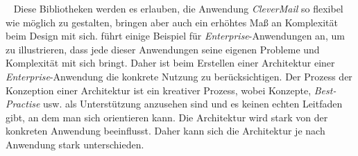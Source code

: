 \ \newline
Diese Bibliotheken werden es erlauben, die Anwendung \emph{CleverMail} so flexibel wie möglich zu gestalten, bringen aber auch ein erhöhtes Maß an Komplexität beim Design mit sich. 
\newline
\newline
\cite[5-6]{patternsOfEnterprise} führt einige Beispiel für \emph{Enterprise}-Anwendungen an, um zu illustrieren, dass jede dieser Anwendungen seine eigenen Probleme und Komplexität mit sich bringt. Daher ist beim Erstellen einer Architektur einer \emph{Enterprise}-Anwendung die konkrete Nutzung zu berücksichtigen. Der Prozess der Konzeption einer Architektur ist ein kreativer Prozess, wobei Konzepte, \emph{Best-Practise} usw. als Unterstützung anzusehen sind und es keinen echten Leitfaden gibt, an dem man sich orientieren kann. Die Architektur wird stark von der konkreten Anwendung beeinflusst. Daher kann sich die Architektur je nach Anwendung stark unterschieden.

